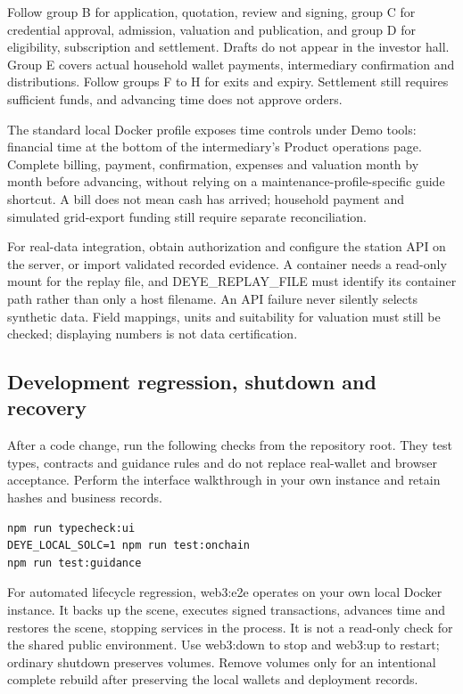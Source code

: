 \documentclass[12pt,a4paper]{article}
\begin{document}
Follow group B for application, quotation, review and signing, group C for credential approval, admission, valuation and publication, and group D for eligibility, subscription and settlement. Drafts do not appear in the investor hall. Group E covers actual household wallet payments, intermediary confirmation and distributions. Follow groups F to H for exits and expiry. Settlement still requires sufficient funds, and advancing time does not approve orders.

The standard local Docker profile exposes time controls under Demo tools: financial time at the bottom of the intermediary's Product operations page. Complete billing, payment, confirmation, expenses and valuation month by month before advancing, without relying on a maintenance-profile-specific guide shortcut. A bill does not mean cash has arrived; household payment and simulated grid-export funding still require separate reconciliation.

For real-data integration, obtain authorization and configure the station API on the server, or import validated recorded evidence. A container needs a read-only mount for the replay file, and DEYE\_REPLAY\_FILE must identify its container path rather than only a host filename. An API failure never silently selects synthetic data. Field mappings, units and suitability for valuation must still be checked; displaying numbers is not data certification.

\subsection{Development regression, shutdown and recovery}
After a code change, run the following checks from the repository root. They test types, contracts and guidance rules and do not replace real-wallet and browser acceptance. Perform the interface walkthrough in your own instance and retain hashes and business records.

\begin{verbatim}
npm run typecheck:ui
DEYE_LOCAL_SOLC=1 npm run test:onchain
npm run test:guidance
\end{verbatim}
For automated lifecycle regression, web3:e2e operates on your own local Docker instance. It backs up the scene, executes signed transactions, advances time and restores the scene, stopping services in the process. It is not a read-only check for the shared public environment. Use web3:down to stop and web3:up to restart; ordinary shutdown preserves volumes. Remove volumes only for an intentional complete rebuild after preserving the local wallets and deployment records.
\end{document}
